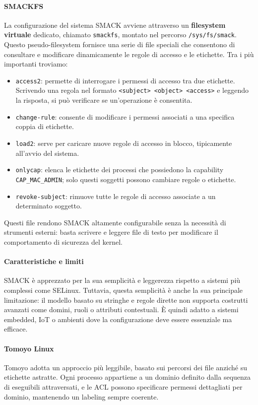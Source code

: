 \paragraph{SMACKFS}
La configurazione del sistema SMACK avviene attraverso un \textbf{filesystem virtuale} dedicato, chiamato \texttt{smackfs}, montato nel percorso \texttt{/sys/fs/smack}.
Questo pseudo-filesystem fornisce una serie di file speciali che consentono di consultare e modificare dinamicamente le regole di accesso e le etichette.
Tra i più importanti troviamo:
\begin{itemize}
  \item \texttt{access2}: permette di interrogare i permessi di accesso tra due etichette. Scrivendo una regola nel formato \texttt{<subject> <object> <access>} e leggendo la risposta, si può verificare se un’operazione è consentita.
  \item \texttt{change-rule}: consente di modificare i permessi associati a una specifica coppia di etichette.
  \item \texttt{load2}: serve per caricare nuove regole di accesso in blocco, tipicamente all’avvio del sistema.
  \item \texttt{onlycap}: elenca le etichette dei processi che possiedono la capability \texttt{CAP\_MAC\_ADMIN}; solo questi soggetti possono cambiare regole o etichette.
  \item \texttt{revoke-subject}: rimuove tutte le regole di accesso associate a un determinato soggetto.
\end{itemize}

Questi file rendono SMACK altamente configurabile senza la necessità di strumenti esterni: basta scrivere e leggere file di testo per modificare il comportamento di sicurezza del kernel.

\paragraph{Caratteristiche e limiti}
SMACK è apprezzato per la sua semplicità e leggerezza rispetto a sistemi più complessi come SELinux.
Tuttavia, questa semplicità è anche la sua principale limitazione: il modello basato su stringhe e regole dirette non supporta costrutti avanzati come domini, ruoli o attributi contestuali.
È quindi adatto a sistemi embedded, IoT o ambienti dove la configurazione deve essere essenziale ma efficace.

\paragraph{Tomoyo Linux}
Tomoyo adotta un approccio più leggibile, basato sui percorsi dei file anziché su etichette astratte.
Ogni processo appartiene a un dominio definito dalla sequenza di eseguibili attraversati, e le ACL possono specificare permessi dettagliati per dominio, mantenendo un labeling sempre coerente.

